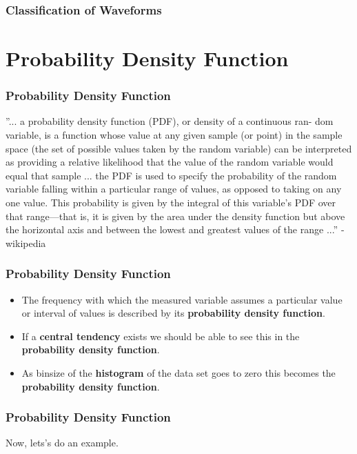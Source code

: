 \documentclass[fleqn]{beamer} %
\newcommand{\sectiontitleIII}{Classification of Waveforms}
\newcommand{\sectiontitleIV}{Probability Density Function}
\begin{document}
	\begin{frame} \small
		\frametitle{\sectiontitleIII}    



	\end{frame}


\section{\sectiontitleIV}	
	\begin{frame}[label=sectionIV] \small
		\frametitle{\sectiontitleIV}    

”... a {\BL probability density function (PDF)}, or density of a continuous ran-
dom variable, is a function whose value at any given sample (or point) in
the sample space (the set of possible values taken by the random variable)
can be interpreted as providing a relative likelihood that the value of the
random variable would equal that sample ... the PDF is used to specify
the probability of the random variable falling within a particular range of
values, as opposed to taking on any one value. This probability is given
by the integral of this variable’s PDF over that range—that is, it is given
by the area under the density function but above the horizontal axis and
between the lowest and greatest values of the range ...” - wikipedia

	\end{frame}
	
	\begin{frame}[label=sectionIV] \small
		\frametitle{\sectiontitleIV}    

			\begin{itemize}
			\item  The frequency with which the measured variable assumes a particular value or interval of values is described by its {\bf \BL probability density function}. \\

            \item  If a {\bf \PR central tendency} exists we should be able to see this in the {\bf \BL probability density function}. \\
                               
            \item  As binsize of the {\bf \GR histogram} of the data set goes to zero this becomes the {\bf \BL probability density function}. \\ 
                                
		\end{itemize}

	\end{frame}

	\begin{frame}[label=sectionIV] \small
		\frametitle{\sectiontitleIV}    
Now, lets's do an example.

	\end{frame}
\end{document}
